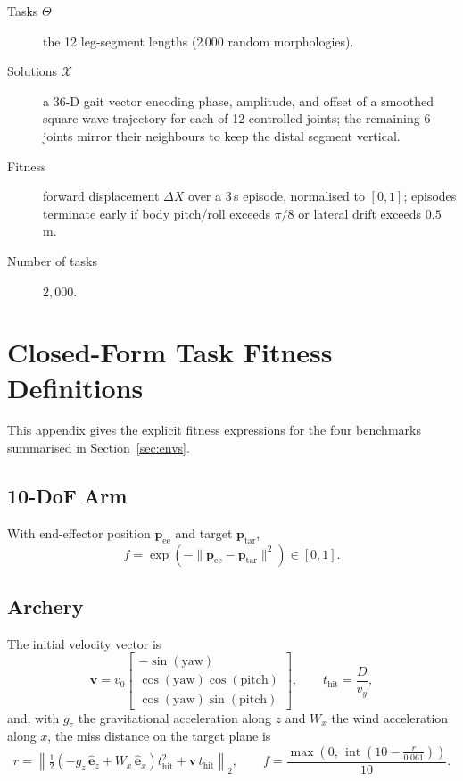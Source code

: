 \documentclass[11pt,a4paper]{article}
\begin{document}
\begin{description}
    \item[Tasks $\Theta$] the 12 leg-segment lengths (2\,000 random
    morphologies).
    \item[Solutions $\mathcal{X}$] a 36-D gait vector encoding phase,
    amplitude, and offset of a smoothed square-wave trajectory for each
    of 12 controlled joints; the remaining 6 joints mirror their
    neighbours to keep the distal segment vertical.
    \item[Fitness] forward displacement $\Delta X$ over a 3\,s episode,
    normalised to $[0,1]$; episodes terminate early if body pitch/roll
    exceeds $\pi/8$ or lateral drift exceeds $0.5$\,m.
    \item[Number of tasks] $2{,}000$.
\end{description}

\section{Closed-Form Task Fitness Definitions}\label{sec:fitness}

This appendix gives the explicit fitness expressions for the four
benchmarks summarised in Section~\ref{sec:envs}.

\subsection{10-DoF Arm}
With end-effector position $\mathbf{p}_{\text{ee}}$ and target
$\mathbf{p}_{\text{tar}}$,
\[
f = \exp\!\left(-\lVert \mathbf{p}_{\text{ee}} - \mathbf{p}_{\text{tar}}
\rVert^{2}\right) \in [0,1].
\]

\subsection{Archery}
The initial velocity vector is
\[
\mathbf{v} = v_{0}
\begin{bmatrix}
-\sin(\text{yaw}) \\
\cos(\text{yaw})\cos(\text{pitch}) \\
\cos(\text{yaw})\sin(\text{pitch})
\end{bmatrix},
\qquad
t_{\text{hit}} = \frac{D}{v_{y}},
\]
and, with $g_{z}$ the gravitational acceleration along $z$ and $W_{x}$
the wind acceleration along $x$, the miss distance on the target plane
is
\[
r = \left\lVert \tfrac{1}{2}\!\left(-g_{z}\,\hat{\mathbf{e}}_{z}
      + W_{x}\,\hat{\mathbf{e}}_{x}\right)t_{\text{hit}}^{2}
      + \mathbf{v}\,t_{\text{hit}} \right\rVert_{2},
\qquad
f = \frac{\max\!\left(0,\,\operatorname{int}\!\left(10
    - \tfrac{r}{0.061}\right)\right)}{10}.
\]
\end{document}
